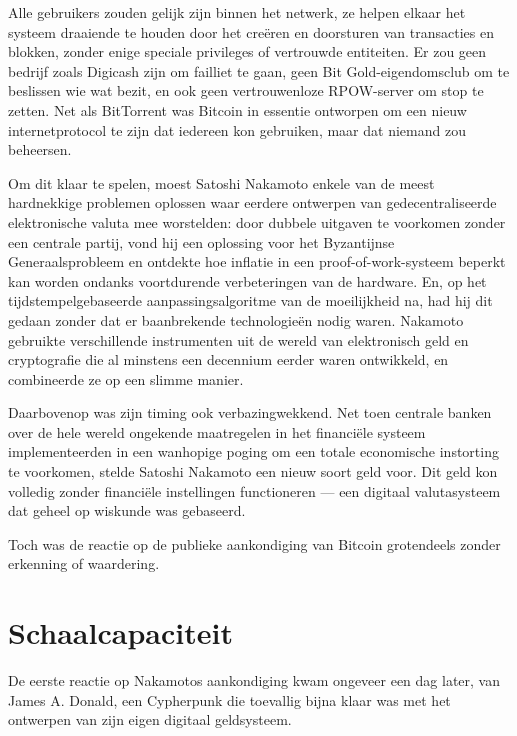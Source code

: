 \documentclass[smalldemyvopaper,11pt,twoside,onecolumn,openright,extrafontsizes,hidelinks]{memoir}
\begin{document}
Alle gebruikers zouden gelijk zijn binnen het netwerk, ze helpen elkaar
het systeem draaiende te houden door het creëren en doorsturen van
transacties en blokken, zonder enige speciale privileges of vertrouwde
entiteiten. Er zou geen bedrijf zoals Digicash zijn om failliet te gaan,
geen Bit Gold-eigendomsclub om te beslissen wie wat bezit, en ook geen
vertrouwenloze RPOW-server om stop te zetten. Net als BitTorrent was
Bitcoin in essentie ontworpen om een nieuw internetprotocol te zijn dat
iedereen kon gebruiken, maar dat niemand zou beheersen.

Om dit klaar te spelen, moest Satoshi Nakamoto enkele van de meest
hardnekkige problemen oplossen waar eerdere ontwerpen van
gedecentraliseerde elektronische valuta mee worstelden: door dubbele
uitgaven te voorkomen zonder een centrale partij, vond hij een oplossing
voor het Byzantijnse Generaalsprobleem en ontdekte hoe inflatie in een
proof-of-work-systeem beperkt kan worden ondanks voortdurende
verbeteringen van de hardware. En, op het tijdstempelgebaseerde
aanpassingsalgoritme van de moeilijkheid na, had hij dit gedaan zonder
dat er baanbrekende technologieën nodig waren. Nakamoto gebruikte
verschillende instrumenten uit de wereld van elektronisch geld en
cryptografie die al minstens een decennium eerder waren ontwikkeld, en
combineerde ze op een slimme manier.

Daarbovenop was zijn timing ook verbazingwekkend. Net toen centrale
banken over de hele wereld ongekende maatregelen in het financiële
systeem implementeerden in een wanhopige poging om een totale
economische instorting te voorkomen, stelde Satoshi Nakamoto een nieuw
soort geld voor. Dit geld kon volledig zonder financiële instellingen
functioneren --- een digitaal valutasysteem dat geheel op wiskunde was
gebaseerd.

Toch was de reactie op de publieke aankondiging van Bitcoin grotendeels
zonder erkenning of waardering.

\section{\texorpdfstring{\textbf{Schaalcapaciteit}}{Schaalcapaciteit}}\label{schaalcapaciteit}

De eerste reactie op Nakamotos aankondiging kwam ongeveer een dag later,
van James A. Donald, een Cypherpunk die toevallig bijna klaar was met
het ontwerpen van zijn eigen digitaal geldsysteem.
\end{document}
